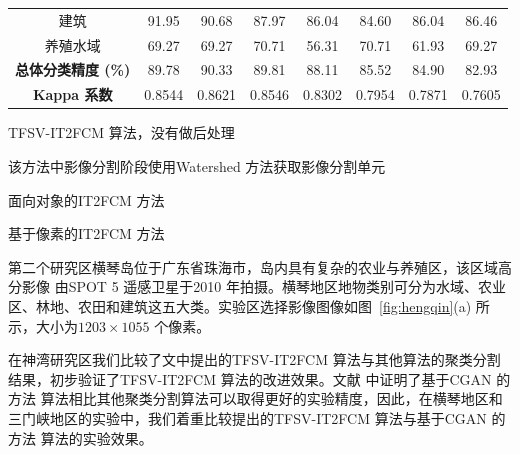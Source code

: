 \begin{table}[htbp]
{\begin{threeparttable}[b]
\begin{tabular}{cccccccc}
                建筑                       & 91.95                & 90.68             & 87.97                & 86.04           & 84.60           & 86.04           & 86.46  \\
                养殖水域                   & 69.27                & 69.27             & 70.71                & 56.31           & 70.71           & 61.93           & 69.27  \\
                \cline{1-8}
                \textbf{总体分类精度 (\%)} & 89.78                & 90.33             & 89.81                & 88.11           & 85.52           & 84.90           & 82.93  \\
                \textbf{Kappa 系数}        & 0.8544               & 0.8621            & 0.8546               & 0.8302          & 0.7954          & 0.7871          & 0.7605 \\
                \bottomrule
            \end{tabular}
            \begin{tablenotes}
                \item[1] {TFSV-IT2FCM 算法，没有做后处理}
                \item[2]{该方法中影像分割阶段使用Watershed 方法获取影像分割单元}
                \item[3]{面向对象的IT2FCM 方法}
                \item[4]{基于像素的IT2FCM 方法}
            \end{tablenotes}
        \end{threeparttable}
    }
\end{table}

第二个研究区横琴岛位于广东省珠海市，岛内具有复杂的农业与养殖区，该区域高分影像
由SPOT 5 遥感卫星于2010 年拍摄。横琴地区地物类别可分为水域、农业区、林地、农田和建筑这五大类。实验区选择影像图像如图~\ref{fig:hengqin}(a) 所示，大小为$1203 \times 1055$ 个像素。

在神湾研究区我们比较了文中提出的TFSV-IT2FCM 算法与其他算法的聚类分割结果，初步验证了TFSV-IT2FCM 算法的改进效果。文献\cite{he2016remote} 中证明了基于CGAN 的方法 算法相比其他聚类分割算法可以取得更好的实验精度，因此，在横琴地区和三门峡地区的实验中，我们着重比较提出的TFSV-IT2FCM 算法与基于CGAN 的方法 算法的实验效果。

